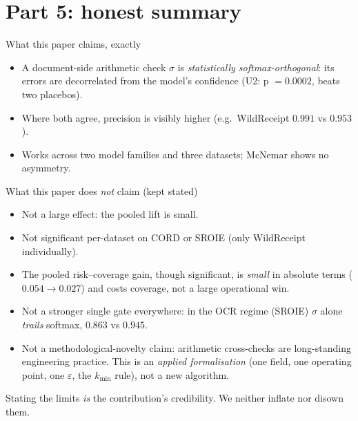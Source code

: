 \documentclass[aspectratio=169]{beamer}
\newcommand{\orthPhiP}{0.0002}
\newcommand{\rcAURCsoft}{0.054}
\newcommand{\rcAURCsig}{0.027}
\newcommand{\keybox}[1]{\begin{center}\colorbox{grey!15}{\parbox{0.92\linewidth}{\centering #1}}\end{center}}
\begin{document}
\section{Part 5: honest summary}
\begin{frame}{What this paper claims, exactly}
\begin{itemize}
\item[\textcolor{ok}{$\checkmark$}] A document-side arithmetic check
$\sigma$ is \emph{statistically softmax-orthogonal}: its errors are
decorrelated from the model's confidence (U2: p $=\orthPhiP$, beats
two placebos).
\item[\textcolor{ok}{$\checkmark$}] Where both agree, precision is
visibly higher (e.g.\ WildReceipt $0.991$ vs $0.953$).
\item[\textcolor{ok}{$\checkmark$}] Works across two model families
and three datasets; McNemar shows no asymmetry.
\end{itemize}
\end{frame}

\begin{frame}{What this paper does \emph{not} claim (kept stated)}
\begin{itemize}
\item[\textcolor{bad}{$\times$}] Not a large effect: the pooled
lift is small.
\item[\textcolor{bad}{$\times$}] Not significant per-dataset on CORD
or SROIE (only WildReceipt individually).
\item[\textcolor{bad}{$\times$}] The pooled risk--coverage gain,
though significant, is \emph{small} in absolute terms
($\rcAURCsoft\!\to\!\rcAURCsig$) and costs coverage, not a large
operational win.
\item[\textcolor{bad}{$\times$}] Not a stronger single gate
everywhere: in the OCR regime (SROIE) $\sigma$ alone \emph{trails}
softmax, $0.863$ vs $0.945$.
\item[\textcolor{bad}{$\times$}] Not a methodological-novelty claim:
arithmetic cross-checks are long-standing engineering practice. This
is an \emph{applied formalisation} (one field, one operating point,
one $\varepsilon$, the $k_{\min}$ rule), not a new algorithm.
\end{itemize}
\keybox{Stating the limits \emph{is} the contribution's credibility.
We neither inflate nor disown them.}
\end{frame}
\end{document}
